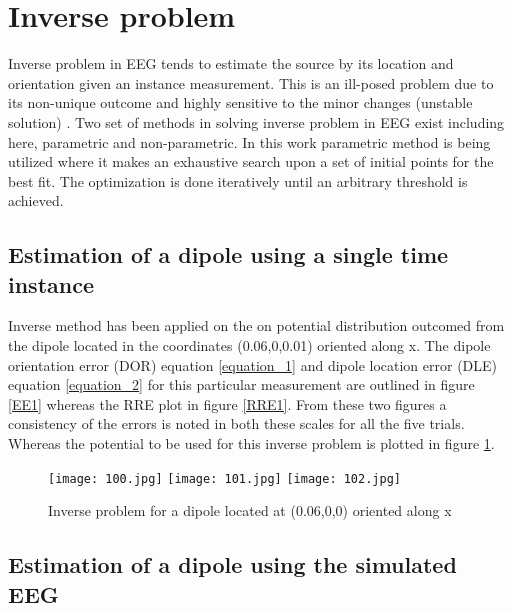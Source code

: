 \section{Inverse problem}

Inverse problem in EEG tends to estimate the source by its location and orientation given an instance measurement. This is an ill-posed problem due to its non-unique outcome and highly sensitive to the minor changes (unstable solution) \cite{3}. Two set of methods in solving inverse problem in EEG exist including here, parametric and non-parametric. In this work parametric method is being utilized where it makes an exhaustive search upon a set of initial points for the best fit. The optimization is done iteratively until an arbitrary threshold is achieved. 

\subsection{Estimation of a dipole using a single time instance}

Inverse method has been applied on the on potential distribution outcomed from the dipole located in the coordinates (0.06,0,0.01) oriented along x. The dipole orientation error (DOR) equation \ref{equation_1} and dipole location error (DLE) equation \ref{equation_2} for this particular measurement are outlined in figure \ref{EE1} whereas the RRE plot in figure \ref{RRE1}. From these two figures a consistency of the errors is noted in both these scales for all the five trials. Whereas the potential to be used for this inverse problem is plotted in figure \ref{VO1}.

\begin{figure}[!htbp]
%
\centering
\texttt{[image: 100.jpg]}
\label{EE1}
\endminipage\hfill
{}%
\centering
\texttt{[image: 101.jpg]}
\label{RRE1}
\endminipage\hfill
{}%
\centering
\texttt{[image: 102.jpg]}
\label{VO1}
\endminipage\hfill
\caption{Inverse problem for a dipole located at (0.06,0,0) oriented along x}
\end{figure}



\subsection{Estimation of a dipole using the simulated EEG}


